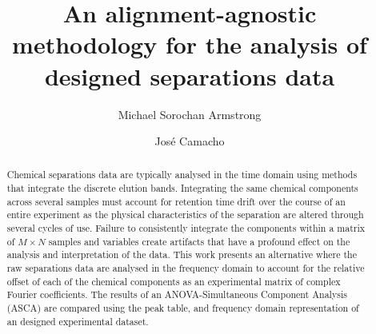 \documentclass[preprint,12pt]{elsarticle}
\begin{document}
\begin{frontmatter}



\title{An alignment-agnostic methodology for the analysis of designed separations data}


\author{Michael Sorochan Armstrong}
\author{Jos\'e Camacho}
\address{Computational Data Science (CoDaS) Lab, Department of Signal Theory, Networks and Communication - University of Granada,%
            C/ Periodista Daniel Saucedo Aranda, 
            Granada,
            18071, 
            Andalusia,
            Spain}
\begin{abstract}
Chemical separations data are typically analysed in the time domain using methods that integrate the discrete elution bands. Integrating the same chemical components across several samples must account for retention time drift over the course of an entire experiment as the physical characteristics of the separation are altered through several cycles of use. Failure to consistently integrate the components within a matrix of $M \times N$ samples and variables create artifacts that have a profound effect on the analysis and interpretation of the data. This work presents an alternative where the raw separations data are analysed in the frequency domain to account for the relative offset of each of the chemical components as an experimental matrix of complex Fourier coefficients. The results of an ANOVA-Simultaneous Component Analysis (ASCA) are compared using the peak table, and frequency domain representation of an designed experimental dataset. 
\end{abstract}


\end{frontmatter}
\end{document}
